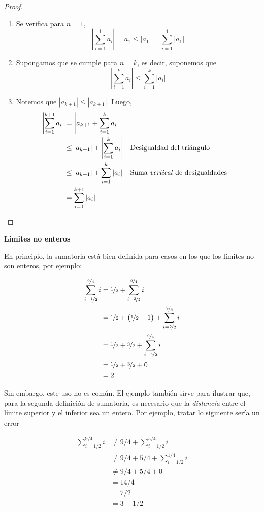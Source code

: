 \begin{proof}\leavevmode
  \begin{enumerate}[label=\roman*)]
    \item Se verifica para $n=1$,
    \[\left| \sum_{i=1}^{1} a_i \right| = a_1 \leq |a_1| = \sum_{i=1}^{1}|a_1|\]
    \item Supongamos que se cumple para $n=k$, es decir, suponemos que
    \[\left| \sum_{i=1}^{k} a_i \right| \leq \sum_{i=1}^{k} |a_i|\]
    \item Notemos que $|a_{k+1}| \leq |a_{k+1}|$. Luego, 
    \begin{align*}
      \left| \sum_{i=1}^{k+1} a_i \right| &= \left|a_{k+1}+ \sum_{i=1}^{k} a_i \right|\\
      &\leq |a_{k+1}| + \left|\sum_{i=1}^{k} a_i \right| && \text{Desigualdad del triángulo}\\
      &\leq |a_{k+1}| + \sum_{i=1}^{k} |a_i| && \text{Suma \textit{vertical} de desigualdades}\\
      &= \sum_{i=1}^{k+1} |a_i|
    \end{align*}
  \end{enumerate}
\end{proof}

\textbf{Límites no enteros}

En principio, la sumatoria está bien definida para casos en los que los límites no son enteros, por ejemplo:

\begin{align*}
  \sum_{i=\nicefrac{1}{2}}^{\nicefrac{9}{4}} i &= \nicefrac{1}{2} + \sum_{i=\nicefrac{3}{2}}^{\nicefrac{9}{4}} i \\
  &= \nicefrac{1}{2} + \big(\nicefrac{1}{2} + 1\big)+ \sum_{i=\nicefrac{5}{2}}^{\nicefrac{9}{4}} i\\
  &= \nicefrac{1}{2} + \nicefrac{3}{2} + \sum_{i=\nicefrac{5}{2}}^{\nicefrac{9}{4}} i\\
  &= \nicefrac{1}{2} + \nicefrac{3}{2} + 0\\
  &= 2
\end{align*}

Sin embargo, este uso no es común. El ejemplo también sirve para ilustrar que, para la segunda definición de sumatoria, es necesario que la \textit{distancia} entre el límite superior y el inferior sea un entero. Por ejemplo, tratar lo siguiente sería un error

\begin{align*}
  \sum_{i=1/2}^{9/4} i &\neq 9/4 + \sum_{i=1/2}^{5/4} i\\
  &\neq 9/4 + 5/4 + \sum_{i=1/2}^{1/4} i\\
  &\neq 9/4 + 5/4 + 0\\
  &= 14/4\\
  &= 7/2\\
  &= 3 + 1/2
\end{align*}

